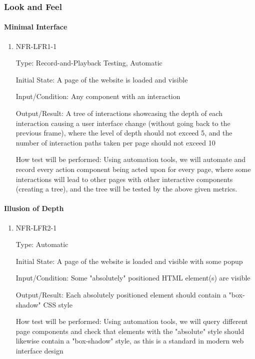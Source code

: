 \documentclass[12pt, titlepage]{article}
\begin{document}
\subsubsection{Look and Feel}
		
\paragraph{Minimal Interface}

\begin{enumerate}

\item{NFR-LFR1-1\\}

Type: Record-and-Playback Testing, Automatic
					
Initial State: A page of the website is loaded and visible
					
Input/Condition: Any component with an interaction
					
Output/Result: A tree of interactions showcasing the depth of each interaction causing a user interface change (without going back to the previous frame), where the level of depth should not exceed 5, and the number of interaction paths taken per page should not exceed 10
					
How test will be performed: Using automation tools, we will automate and record every action component being acted upon for every page, where some interactions will lead to other pages with other interactive components (creating a tree), and the tree will be tested by the above given metrics.

\end{enumerate}

\paragraph{Illusion of Depth}

\begin{enumerate}

\item{NFR-LFR2-1\\}

Type: Automatic
					
Initial State: A page of the website is loaded and visible with some popup
					
Input/Condition: Some "absolutely" positioned HTML element(s) are visible
					
Output/Result: Each absolutely positioned element should contain a "box-shadow" CSS style
					
How test will be performed: Using automation tools, we will query different page components and check that elements with the "absolute" style should likewise contain a "box-shadow" style, as this is a standard in modern web interface design

\end{enumerate}
\end{document}

